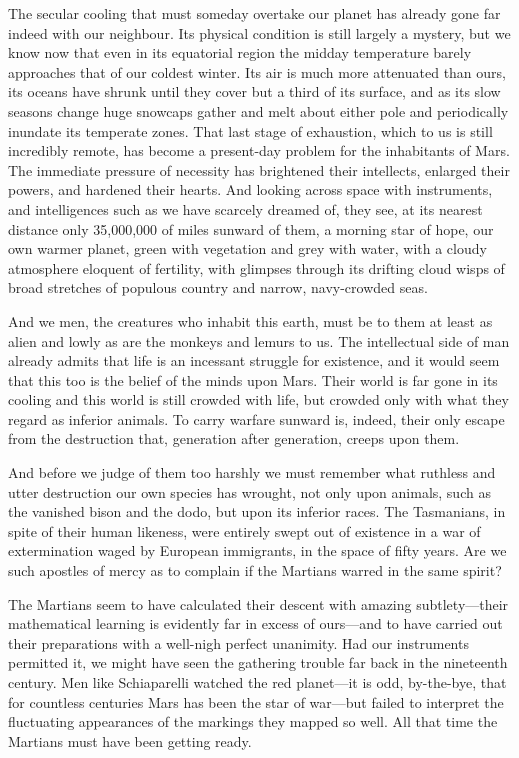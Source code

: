 The secular cooling that must someday overtake our planet has already gone far indeed with our neighbour. Its physical condition is still largely a mystery, but we know now that even in its equatorial region the midday temperature barely approaches that of our coldest winter. Its air is much more attenuated than ours, its oceans have shrunk until they cover but a third of its surface, and as its slow seasons change huge snowcaps gather and melt about either pole and periodically inundate its temperate zones. That last stage of exhaustion, which to us is still incredibly remote, has become a present-day problem for the inhabitants of Mars. The immediate pressure of necessity has brightened their intellects, enlarged their powers, and hardened their hearts. And looking across space with instruments, and intelligences such as we have scarcely dreamed of, they see, at its nearest distance only 35,000,000 of miles sunward of them, a morning star of hope, our own warmer planet, green with vegetation and grey with water, with a cloudy atmosphere eloquent of fertility, with glimpses through its drifting cloud wisps of broad stretches of populous country and narrow, navy-crowded seas.

And we men, the creatures who inhabit this earth, must be to them at least as alien and lowly as are the monkeys and lemurs to us. The intellectual side of man already admits that life is an incessant struggle for existence, and it would seem that this too is the belief of the minds upon Mars. Their world is far gone in its cooling and this world is still crowded with life, but crowded only with what they regard as inferior animals. To carry warfare sunward is, indeed, their only escape from the destruction that, generation after generation, creeps upon them.

And before we judge of them too harshly we must remember what ruthless and utter destruction our own species has wrought, not only upon animals, such as the vanished bison and the dodo, but upon its inferior races. The Tasmanians, in spite of their human likeness, were entirely swept out of existence in a war of extermination waged by European immigrants, in the space of fifty years. Are we such apostles of mercy as to complain if the Martians warred in the same spirit?

The Martians seem to have calculated their descent with amazing subtlety—their mathematical learning is evidently far in excess of ours—and to have carried out their preparations with a well-nigh perfect unanimity. Had our instruments permitted it, we might have seen the gathering trouble far back in the nineteenth century. Men like Schiaparelli watched the red planet—it is odd, by-the-bye, that for countless centuries Mars has been the star of war—but failed to interpret the fluctuating appearances of the markings they mapped so well. All that time the Martians must have been getting ready.

